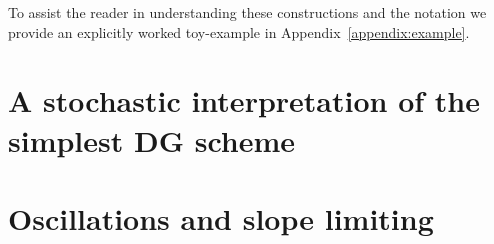 
To assist the reader in understanding these constructions and the notation we provide an explicitly worked toy-example in Appendix~\ref{appendix:example}.

\section{A stochastic interpretation of the simplest DG scheme}

\section{Oscillations and slope limiting}\label{sec: slope limiting}
